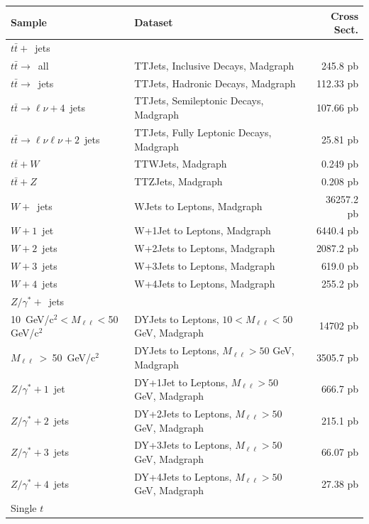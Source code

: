 \begin{table}[hbtp]\footnotesize
\centering
\begin{tabular}{|p{}|p{}|r|}
\hline\hline
Sample & Dataset & Cross Sect. \\
\hline
$t\bar{t}+$~jets & & \\
$t\bar{t}\rightarrow$~all & TTJets, Inclusive Decays, Madgraph & 245.8 pb \\
 $t\bar{t}\rightarrow$~jets & TTJets, Hadronic Decays, Madgraph & 112.33 pb \\
$t\bar{t}\rightarrow\ell\nu+4$~jets & TTJets, Semileptonic Decays, Madgraph & 107.66 pb \\
$t\bar{t}\rightarrow\ell\nu\ell\nu+2$~jets & TTJets, Fully Leptonic
                                             Decays, Madgraph & 25.81 pb \\
\hline
$t\bar{t}+W$ & TTWJets, Madgraph & 0.249 pb \\
\hline
$t\bar{t}+Z$ & TTZJets, Madgraph & 0.208 pb \\
\hline
$W+$~jets & WJets to Leptons, Madgraph & 36257.2 pb \\
$W+1$~jet & W+1Jet to Leptons, Madgraph & 6440.4 pb \\
$W+2$~jets & W+2Jets to Leptons, Madgraph & 2087.2 pb \\
$W+3$~jets & W+3Jets to Leptons, Madgraph & 619.0 pb \\
$W+4$~jets & W+4Jets to Leptons, Madgraph & 255.2 pb \\
\hline
$Z/\gamma^* +$~jets & & \\
10~GeV/c$^2 < M_{\ell\ell} < $50 GeV/c$^2$ & DYJets to Leptons,
                                             $10<M_{\ell\ell}<50$ GeV,
                                             Madgraph & 14702 pb \\
$M_{\ell\ell}~>~$50~GeV/c$^2$ & DYJets to Leptons, $M_{\ell\ell}>50$
                                GeV, Madgraph & 3505.7 pb \\
$Z/\gamma^* +1$~jet & DY+1Jet to Leptons, $M_{\ell\ell}>50$ GeV, Madgraph & 666.7 pb \\
$Z/\gamma^* +2$~jets & DY+2Jets to Leptons, $M_{\ell\ell}>50$ GeV, Madgraph & 215.1 pb \\
$Z/\gamma^* +3$~jets & DY+3Jets to Leptons, $M_{\ell\ell}>50$ GeV, Madgraph & 66.07 pb \\
$Z/\gamma^* +4$~jets & DY+4Jets to Leptons, $M_{\ell\ell}>50$ GeV, Madgraph & 27.38 pb \\
\hline
Single $t$ & & \\

\end{tabular}
\end{table}
